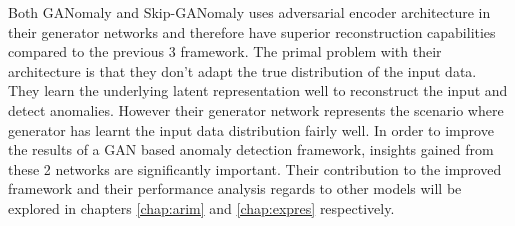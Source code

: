 Both GANomaly and Skip-GANomaly uses adversarial encoder architecture in their generator networks
and therefore have superior reconstruction capabilities compared to the previous 3 framework. The
primal problem with their architecture is that they don't adapt the true distribution of the input
data. They learn the underlying latent representation well to reconstruct the input and detect
anomalies. However their generator network represents the scenario where  generator has learnt the
input data distribution fairly well. In order to improve the results of a GAN based anomaly
detection framework, insights gained from these 2 networks are significantly important. Their
contribution to the improved framework and their performance analysis regards to other models will
be explored in chapters \ref{chap:arim} and \ref{chap:expres} respectively. 
\endgroup
